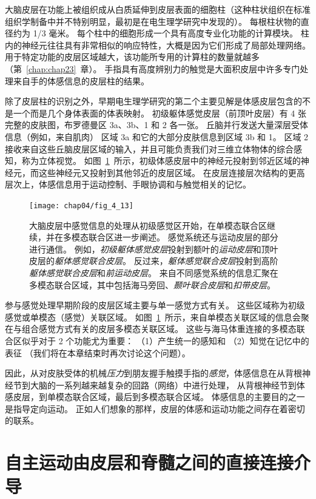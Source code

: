 大脑皮层在功能上被组织成从白质延伸到皮层表面的细胞柱（这种柱状组织在标准组织学制备中并不特别明显，最初是在电生理学研究中发现的）。
每根柱状物的直径约为 1/3 毫米。
每个柱中的细胞形成一个具有高度专业化功能的计算模块。
柱内的神经元往往具有非常相似的响应特性，大概是因为它们形成了局部处理网络。 
用于特定功能的皮层区域越大，该功能所专用的计算柱的数量就越多（第~\ref{chap:chap23}~章）。 
手指具有高度辨别力的触觉是大面积皮层中许多专门处理来自手的体感信息的皮层柱的结果。


除了皮层柱的识别之外，早期电生理学研究的第二个主要见解是体感皮层包含的不是一个而是几个身体表面的体表映射。
初级躯体感觉皮层（前顶叶皮层）有 4 张完整的皮肤图，布罗德曼区 3a、3b、1 和 2 各一张。
丘脑并行发送大量深层受体信息（例如，来自肌肉） 区域 3a 和它的大部分皮肤信息到区域 3b 和 1。
区域 2 接收来自这些丘脑皮层区域的输入，并且可能负责我们对三维立体物体的综合感知，称为立体视觉。
如图~\ref{fig:4_13}~所示，初级体感皮层中的神经元投射到邻近区域的神经元，而这些神经元又投射到其他邻近的皮层区域。
在皮层连接层次结构的更高层次上，体感信息用于运动控制、手眼协调和与触觉相关的记忆。


\begin{figure}[htbp]
	\centering
	\texttt{[image: chap04/fig\_4\_13]}
	\caption{大脑皮层中感觉信息的处理从初级感觉区开始，在单模态联合区继续，并在多模态联合区进一步阐述。
		感觉系统还与运动皮层的部分进行通信。
		例如，\textit{初级躯体感觉皮层}投射到额叶的\textit{运动皮层}和顶叶皮层的\textit{躯体感觉联合皮层}。
		反过来，\textit{躯体感觉联合皮层}投射到高阶\textit{躯体感觉联合皮层}和\textit{前运动皮层}。
		来自不同感觉系统的信息汇聚在多模态联合区域，其中包括海马旁回、\textit{颞叶联合皮层}和\textit{扣带皮层}。}
	\label{fig:4_13}
\end{figure}


参与感觉处理早期阶段的皮层区域主要与单一感觉方式有关。
这些区域称为初级感觉或单模态（感觉）关联区域。
如图~\ref{fig:4_13}~所示，来自单模态关联区域的信息会聚在与组合感觉方式有关的皮层多模态关联区域。
这些与海马体重连接的多模态联合区似乎对于 2 个功能尤为重要：
（1）产生统一的感知和 
（2）知觉在记忆中的表征
（我们将在本章结束时再次讨论这个问题）。


因此，从对皮肤受体的机械\textit{压力}到朋友握手触摸手指的\textit{感觉}，体感信息在从背根神经节到大脑的一系列越来越复杂的回路（网络）中进行处理，
从背根神经节到体感皮层，到单模态联合区域，最后到多模态联合区域。
体感信息的主要目的之一是指导定向运动。
正如人们想象的那样，皮层的体感和运动功能之间存在着密切的联系。



\section{自主运动由皮层和脊髓之间的直接连接介导}

